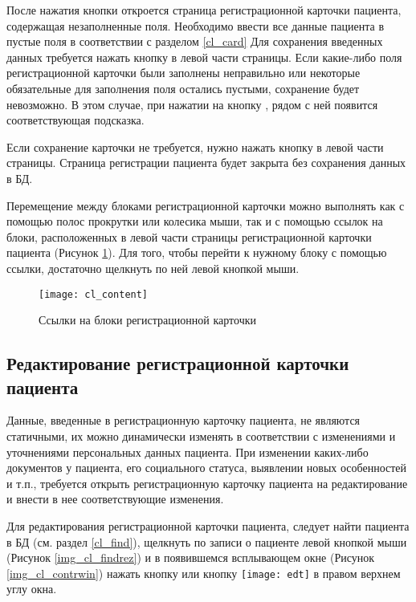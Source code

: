 После нажатия кнопки  откроется страница регистрационной карточки пациента,  содержащая незаполненные поля. Необходимо ввести все данные пациента в пустые поля в соответствии с разделом \ref{cl_card} Для сохранения введенных данных требуется нажать кнопку  в левой части страницы. Если какие-либо поля регистрационной карточки были заполнены неправильно или некоторые обязательные для заполнения поля остались пустыми, сохранение будет невозможно. В этом случае, при нажатии на кнопку , рядом с ней появится соответствующая подсказка.

Если сохранение карточки не требуется, нужно нажать кнопку  в левой части страницы. Страница регистрации пациента будет закрыта без сохранения данных в БД.

Перемещение между блоками регистрационной карточки можно выполнять как с помощью полос прокрутки или колесика мыши, так и с помощью ссылок на блоки, расположенных в левой части страницы регистрационной карточки пациента (Рисунок \ref{img_cl_content}). Для того, чтобы перейти к нужному блоку с помощью ссылки, достаточно щелкнуть по ней левой кнопкой мыши.

\begin{figure}[ht]\centering
 \texttt{[image: cl\_content]}
 \caption{Ссылки на блоки регистрационной карточки}
 \label{img_cl_content}
\end{figure} 

\subsection{Редактирование регистрационной карточки пациента}

Данные, введенные в регистрационную карточку пациента, не являются статичными, их можно динамически изменять в соответствии с изменениями и уточнениями персональных данных пациента. При изменении каких-либо документов у пациента, его социального статуса, выявлении новых особенностей и т.п., требуется открыть регистрационную карточку пациента на редактирование и внести в нее соответствующие изменения. 

Для редактирования регистрационной карточки пациента, следует найти пациента в БД (см. раздел \ref{cl_find}), щелкнуть по записи о пациенте левой кнопкой мыши (Рисунок \ref{img_cl_findrez}) и в появившемся всплывающем окне (Рисунок \ref{img_cl_contrwin}) нажать кнопку  или кнопку \texttt{[image: edt]} в правом верхнем углу окна. 

